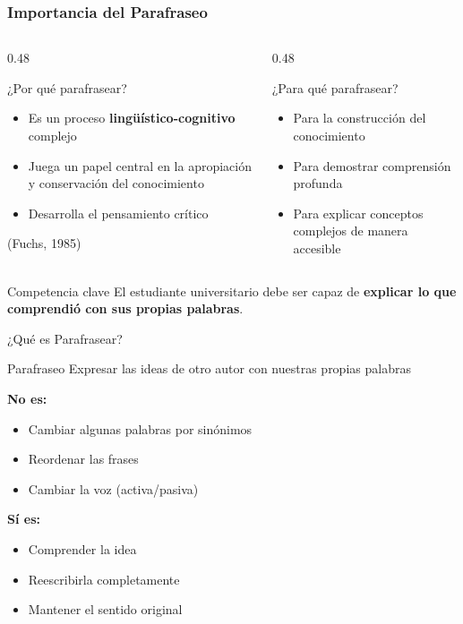 \documentclass[aspectratio=169]{beamer}
\begin{document}
\begin{frame}
	\frametitle{Importancia del Parafraseo}
	\begin{columns}[c]
		\begin{column}{0.48\textwidth}
			\begin{block}{¿Por qué parafrasear?}
				\begin{itemize}
					\item Es un proceso \textbf{lingüístico-cognitivo} complejo
					\item Juega un papel central en la apropiación y conservación del conocimiento
					\item Desarrolla el pensamiento crítico
				\end{itemize}
				\vspace{0.3em}
				\small{(Fuchs, 1985)}
			\end{block}
		\end{column}
		
		\begin{column}{0.48\textwidth}
			\begin{block}{¿Para qué parafrasear?}
				\begin{itemize}
					\item Para la construcción del conocimiento
					\item Para demostrar comprensión profunda
					\item Para explicar conceptos complejos de manera accesible
				\end{itemize}
			\end{block}
		\end{column}
	\end{columns}
	
	\vspace{0.5em}
	
	\begin{alertblock}{Competencia clave}
		El estudiante universitario debe ser capaz de \textbf{explicar lo que comprendió con sus propias palabras}.
	\end{alertblock}
\end{frame}

\begin{frame}{¿Qué es Parafrasear?}
\begin{block}{Parafraseo}
Expresar las ideas de otro autor con nuestras propias palabras
\end{block}

\textbf{No es:}
\begin{itemize}
    \item Cambiar algunas palabras por sinónimos
    \item Reordenar las frases
    \item Cambiar la voz (activa/pasiva)
\end{itemize}

\textbf{Sí es:}
\begin{itemize}
    \item Comprender la idea
    \item Reescribirla completamente
    \item Mantener el sentido original
\end{itemize}
\end{frame}
\end{document}
